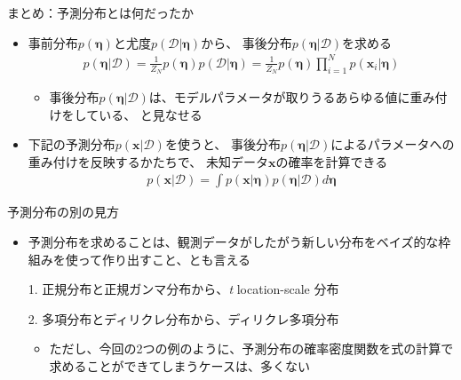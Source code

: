 \documentclass[aspectratio=169,unicode,dvipdfmx,14pt]{beamer}
\begin{document}
\begin{frame}{まとめ：予測分布とは何だったか}
\begin{itemize}
\item 事前分布$p(\bm{\eta})$と尤度$p(\mathcal{D}|\bm{\eta})$から、
事後分布$p(\bm{\eta} | \mathcal{D})$を求める
\begin{align}
p(\bm{\eta} | \mathcal{D}) = \frac{1}{Z_N} p(\bm{\eta}) p(\mathcal{D}|\bm{\eta})
= \frac{1}{Z_N} p(\bm{\eta}) \prod_{i=1}^N p(\bm{x}_i | \bm{\eta})
\end{align}
\vspace{-.2in}
\begin{itemize}
\item 事後分布$p(\bm{\eta} | \mathcal{D})$は、モデルパラメータが取りうるあらゆる値に重み付けをしている、
と見なせる
\end{itemize}
\item 下記の予測分布$p(\bm{x}|\mathcal{D})$を使うと、
事後分布$p(\bm{\eta} | \mathcal{D})$によるパラメータへの重み付けを反映するかたちで、
未知データ$\bm{x}$の確率を計算できる
\begin{align}
p(\bm{x}|\mathcal{D}) = \int p(\bm{x}|\bm{\eta}) p(\bm{\eta} | \mathcal{D}) d\bm{\eta}
\end{align}
\end{itemize}
\end{frame}

\begin{frame}{予測分布の別の見方}
\begin{itemize}
\item 予測分布を求めることは、観測データがしたがう新しい分布をベイズ的な枠組みを使って作り出すこと、とも言える
\item[1.] 正規分布と正規ガンマ分布から、\textit{t} location-scale 分布
\item[2.] 多項分布とディリクレ分布から、ディリクレ多項分布 
\begin{itemize}
\item ただし、今回の2つの例のように、予測分布の確率密度関数を式の計算で求めることができてしまうケースは、多くない
\end{itemize}
\end{itemize}
\end{frame}
\end{document}
